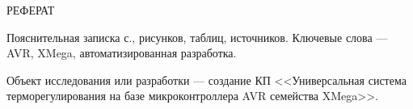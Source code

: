 \begin{center}\MakeUppercase{Реферат}\end{center}

Пояснительная записка  с.,  рисунков,  таблиц,  источников.
Ключевые слова --- AVR, XMega, автоматизированная разработка.


Объект исследования или разработки --- создание КП <<Универсальная система терморегулирования
 на базе микроконтроллера AVR семейства XMega>>.

\newpage{}









